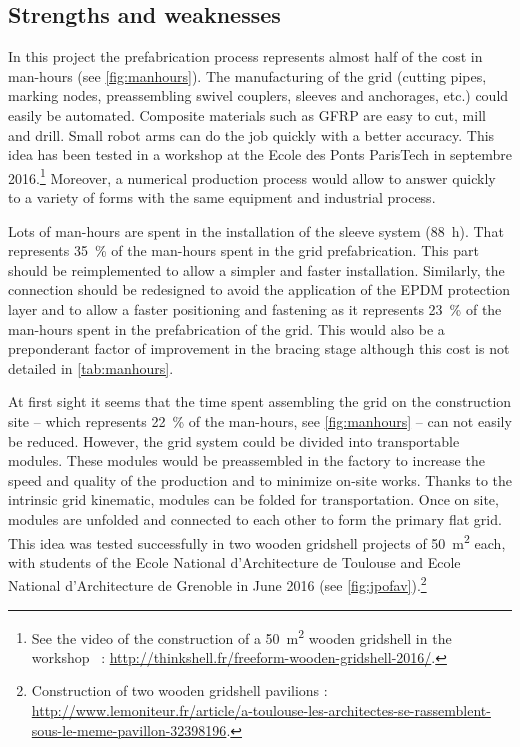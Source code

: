 \subsection{Strengths and weaknesses}
In this project the prefabrication process represents almost half of the cost in man-hours (see \cref{fig:manhours}). The manufacturing of the grid (cutting pipes, marking nodes, preassembling swivel couplers, sleeves and anchorages, etc.) could easily be automated. Composite materials such as GFRP are easy to cut, mill and drill. Small robot arms can do the job quickly with a better accuracy. This idea has been tested in a workshop at the Ecole des Ponts ParisTech in septembre 2016.\footnote{See the video of the construction of a 50~m\textsuperscript{2} wooden gridshell in the workshop ~: \url{http://thinkshell.fr/freeform-wooden-gridshell-2016/}.} Moreover, a numerical production process would allow to answer quickly to a variety of forms with the same equipment and industrial process.

Lots of man-hours are spent in the installation of the sleeve system (88~h). That represents 35~\% of the man-hours spent in the grid prefabrication. This part should be reimplemented to allow a simpler and faster installation. Similarly, the connection should be redesigned to avoid the application of the EPDM protection layer and to allow a faster positioning and fastening as it represents 23~\% of the man-hours spent in the prefabrication of the grid. This would also be a preponderant factor of improvement in the bracing stage although this cost is not detailed in \cref{tab:manhours}.

At first sight it seems that the time spent assembling the grid on the construction site -- which represents 22~\% of the man-hours, see \cref{fig:manhours} -- can not easily be reduced. However, the grid system could be divided into transportable modules. These modules would be preassembled in the factory to increase the speed and quality of the production and to minimize on-site works. Thanks to the intrinsic grid kinematic, modules can be folded for transportation. Once on site, modules are unfolded and connected to each other to form the primary flat grid. This idea was tested successfully in two wooden gridshell projects of 50~m\textsuperscript{2} each, with students of the Ecole National d'Architecture de Toulouse and Ecole National d'Architecture de Grenoble in June 2016 (see \cref{fig:jpofav}).\footnote{Construction of two wooden gridshell pavilions :\\ \url{http://www.lemoniteur.fr/article/a-toulouse-les-architectes-se-rassemblent-sous-le-meme-pavillon-32398196}.}

